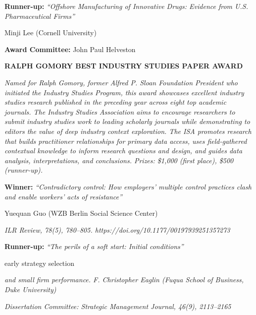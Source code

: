 \documentclass[
  10pt,
  letterpaper,
  DIV=11,
  numbers=noendperiod]{scrartcl}
\begin{document}
{\noindent \textbf{Runner-up:} \textit{``Offshore Manufacturing of Innovative Drugs: Evidence from U.S. Pharmaceutical Firms''}\par
\noindent Minji Lee (Cornell University)\par
\vspace{0.2em}

\noindent\textbf{Award Committee:} John Paul Helveston\par
\vspace{0.4em}

\noindent\textcolor{event}{\textbf{RALPH GOMORY BEST INDUSTRY STUDIES PAPER AWARD}}\par\vspace{0.1em}
\noindent\textit{Named for Ralph Gomory, former Alfred P. Sloan Foundation President who initiated the Industry Studies Program, this award showcases excellent industry studies research published in the preceding year across eight top academic journals. The Industry Studies Association aims to encourage researchers to submit industry studies work to leading scholarly journals while demonstrating to editors the value of deep industry context exploration. The ISA promotes research that builds practitioner relationships for primary data access, uses field-gathered contextual knowledge to inform research questions and design, and guides data analysis, interpretations, and conclusions. Prizes: \$1,000 (first place), \$500 (runner-up).}\par\vspace{0.15em}
\noindent \textbf{Winner:} \textit{``Contradictory control: How employers' multiple control practices clash and enable workers' acts of resistance''}\par
\noindent Yuequan Guo (WZB Berlin Social Science Center)\par
\noindent\textit{ILR Review, 78(5), 780–805. https://doi.org/10.1177/00197939251357273}\par
\vspace{0.2em}

\noindent \textbf{Runner-up:} \textit{``The perils of a soft start: Initial conditions''}\par
\noindent early strategy selection\par
\noindent\textit{and small firm performance. F. Christopher Eaglin (Fuqua School of Business, Duke University)}\par
\noindent\textit{Dissertation Committee: Strategic Management Journal, 46(9), 2113–2165}\par
\vspace{0.2em}

}
\end{document}

